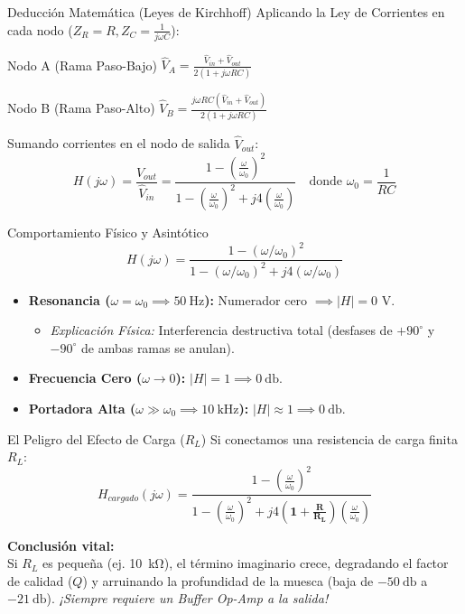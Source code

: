 \documentclass[aspectratio=169, 10pt]{beamer}
\begin{document}
\begin{frame}{Deducción Matemática (Leyes de Kirchhoff)}
    Aplicando la Ley de Corrientes en cada nodo ($Z_R=R, Z_C=\frac{1}{j\omega C}$):
    \vspace{0.2cm}
    \begin{block}{Nodo A (Rama Paso-Bajo)}
        $\hat{V}_A = \frac{\hat{V}_{in} + \hat{V}_{out}}{2(1 + j\omega RC)}$
    \end{block}
    \begin{block}{Nodo B (Rama Paso-Alto)}
        $\hat{V}_B = \frac{j\omega RC (\hat{V}_{in} + \hat{V}_{out})}{2(1 + j\omega RC)}$
    \end{block}
    \vspace{0.2cm}
    Sumando corrientes en el nodo de salida $\hat{V}_{out}$:
    $$H(j\omega) = \frac{\hat{V}_{out}}{\hat{V}_{in}} = \frac{1 - \left(\frac{\omega}{\omega_0}\right)^2}{1 - \left(\frac{\omega}{\omega_0}\right)^2 + j 4 \left(\frac{\omega}{\omega_0}\right)} \quad \text{donde } \omega_0 = \frac{1}{RC}$$
\end{frame}

\begin{frame}{Comportamiento Físico y Asintótico}
    $$H(j\omega) = \frac{1 - (\omega/\omega_0)^2}{1 - (\omega/\omega_0)^2 + j 4 (\omega/\omega_0)}$$
    \vspace{0.2cm}
    \begin{itemize}[itemsep=8pt]
        \item \textbf{Resonancia ($\omega = \omega_0 \implies \qty{50}{\hertz}$):} Numerador cero $\implies \vert{}H\vert{} = 0\text{ V}$.
        \begin{itemize}
            \item \textit{Explicación Física:} Interferencia destructiva total (desfases de $+90^\circ$ y $-90^\circ$ de ambas ramas se anulan).
        \end{itemize}
        \item \textbf{Frecuencia Cero ($\omega \to 0$):} $\vert{}H\vert{} = 1 \implies \qty{0}{\decibel}$.
        \item \textbf{Portadora Alta ($\omega \gg \omega_0 \implies \qty{10}{\kilo\hertz}$):} $\vert{}H\vert{} \approx 1 \implies \qty{0}{\decibel}$.
    \end{itemize}
\end{frame}

\begin{frame}{El Peligro del Efecto de Carga ($R_L$)}
    Si conectamos una resistencia de carga finita $R_L$:
    $$H_{cargado}(j\omega) = \frac{1 - \left(\frac{\omega}{\omega_0}\right)^2}{1 - \left(\frac{\omega}{\omega_0}\right)^2 + j 4 \mathbf{\left(1 + \frac{R}{R_L}\right)} \left(\frac{\omega}{\omega_0}\right)}$$
    
    \vspace{0.3cm}
    \textbf{Conclusión vital:} \\
    Si $R_L$ es pequeña (ej. \qty{10}{\kilo\ohm}), el término imaginario crece, degradando el factor de calidad ($Q$) y arruinando la profundidad de la muesca (baja de $\qty{-50}{\decibel}$ a $\qty{-21}{\decibel}$). \textit{¡Siempre requiere un Buffer Op-Amp a la salida!}
\end{frame}
\end{document}
